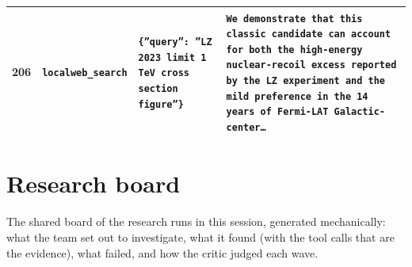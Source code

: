 \documentclass[11pt,a4paper]{article}
\begin{document}
\begin{longtable}{@{}p{}p{}p{}p{}@{}}
206 & \texttt{local}\newline\texttt{web\_\allowbreak{}search} & \texttt{\{''query'':\allowbreak{} ''LZ 2023 limit 1 TeV cross section figure''\}\allowbreak{}} & \texttt{We demonstrate that this classic candidate can account for both the high-energy nuclear-recoil excess reported by the LZ experiment and the mild preference in the 14 years of Fermi-LAT Galactic-center\ldots{}\allowbreak{}} \\
\bottomrule\end{longtable}

\section{Research board}
\label{app:board}
The shared board of the research runs in this session, generated mechanically: what the team set out to investigate, what it found (with the tool calls that are the evidence), what failed, and how the critic judged each wave.
\end{document}
